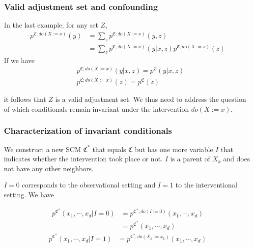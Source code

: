 \documentclass{beamer}
\begin{document}
\begin{frame}
    \frametitle{Valid adjustment set and confounding}
    In the last example, for any set $Z$,
    \begin{align*}
        p^{\mathfrak{C};do(X:=x)}(y) &= \sum_z p^{\mathfrak{C};do(X:=x)}(y,z) \\
        &= \sum_z p^{\mathfrak{C};do(X:=x)}(y|x,z)p^{\mathfrak{C};do(X:=x)}(z)
    \end{align*}
    If we have
    \begin{align*}
        &p^{\mathfrak{C};do(X:=x)}(y|x,z) = p^{\mathfrak{C}}(y|x,z) \\
        &p^{\mathfrak{C};do(X:=x)}(z) = p^{\mathfrak{C}}(z)
    \end{align*}
    \begin{flushleft}
        it follows that $Z$ is a valid adjustment set. We thus need to address the question of which conditionals remain
        invariant under the intervention $do(X:=x)$.
    \end{flushleft}
\end{frame}

\begin{frame}
    \frametitle{Characterization of invariant conditionals}
    \begin{flushleft}
        We construct a new SCM $\mathfrak{C}^*$ that equals $\mathfrak{C}$ but has one more variable $I$ that indicates whether 
        the intervention took place or not. $I$ is a parent of $X_k$ and does not have any other neighbors. 
    \end{flushleft}
    \begin{flushleft}
        $I=0$ corresponds to the observational setting and $I=1$ to the interventional setting. We have
    \end{flushleft}
    \begin{align*}
        p^{\mathfrak{C}^*}(x_1,\cdots,x_d|I=0) &= p^{\mathfrak{C}^*;do(I:=0)}(x_1,\cdots,x_d) \\
        &= p^{\mathfrak{C}^*}(x_1,\cdots,x_d)
    \end{align*}
    \begin{align*}
        p^{\mathfrak{C}^*}(x_1,\cdots,x_d|I=1) &= p^{\mathfrak{C}^*;do(X_k:=x_k)}(x_1,\cdots,x_d)
    \end{align*}
\end{frame}
\end{document}
